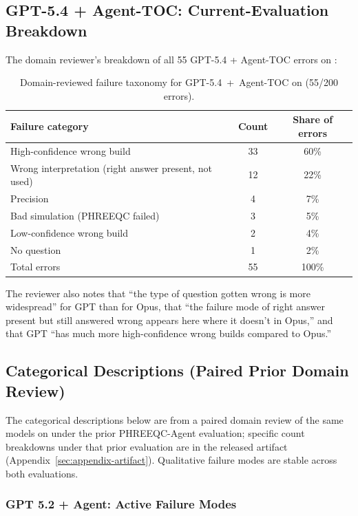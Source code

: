 \documentclass{article}
\begin{document}
\subsection{GPT-5.4 + Agent-TOC: Current-Evaluation Breakdown}

The domain reviewer's breakdown of all 55 GPT-5.4 + Agent-TOC errors on \BenchName{}:

\begin{table}[h]
\centering
\small
\caption{Domain-reviewed failure taxonomy for GPT-5.4~+~Agent-TOC on \BenchName{} (55/200 errors).}
\label{tab:appendix-gpt-failure}
\begin{tabular}{lcc}
\toprule
Failure category & Count & Share of errors \\
\midrule
High-confidence wrong build & 33 & 60\% \\
Wrong interpretation (right answer present, not used) & 12 & 22\% \\
Precision & 4 & 7\% \\
Bad simulation (PHREEQC failed) & 3 & 5\% \\
Low-confidence wrong build & 2 & 4\% \\
No question & 1 & 2\% \\
\midrule
Total errors & 55 & 100\% \\
\bottomrule
\end{tabular}
\end{table}

The reviewer also notes that ``the type of question gotten wrong is more widespread'' for GPT than for Opus, that ``the failure mode of right answer present but still answered wrong appears here where it doesn't in Opus,'' and that GPT ``has much more high-confidence wrong builds compared to Opus.''

\subsection{Categorical Descriptions (Paired Prior Domain Review)}

The categorical descriptions below are from a paired domain review of the same models on \BenchName{} under the prior PHREEQC-Agent evaluation; specific count breakdowns under that prior evaluation are in the released artifact (Appendix~\ref{sec:appendix-artifact}). Qualitative failure modes are stable across both evaluations.

\subsubsection{GPT 5.2 + Agent: Active Failure Modes}
\end{document}
